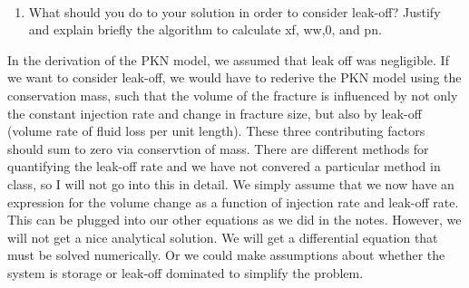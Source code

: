\documentclass[11pt]{article}
\providecommand{\tightlist}{%
      \setlength{\itemsep}{0pt}\setlength{\parskip}{0pt}}
\begin{document}
    \begin{center}
    \end{center}
    { \hspace*{\fill} \\}
    
    \begin{enumerate}
\def\labelenumi{\alph{enumi}.}
\setcounter{enumi}{2}
\tightlist
\item
  What should you do to your solution in order to consider leak-off?
  Justify and explain briefly the algorithm to calculate xf, ww,0, and
  pn.
\end{enumerate}

    In the derivation of the PKN model, we assumed that leak off was
negligible. If we want to consider leak-off, we would have to rederive
the PKN model using the conservation mass, such that the volume of the
fracture is influenced by not only the constant injection rate and
change in fracture size, but also by leak-off (volume rate of fluid loss
per unit length). These three contributing factors should sum to zero
via conservtion of mass. There are different methods for quantifying the
leak-off rate and we have not convered a particular method in class, so
I will not go into this in detail. We simply assume that we now have an
expression for the volume change as a function of injection rate and
leak-off rate. This can be plugged into our other equations as we did in
the notes. However, we will not get a nice analytical solution. We will
get a differential equation that must be solved numerically. Or we could
make assumptions about whether the system is storage or leak-off
dominated to simplify the problem.


    
    
    
    
\end{document}
